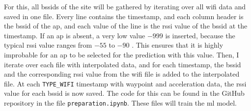 For this, all \acp{bssid} of the site will be gathered by iterating over all \ac{wifi} data and saved in one file.
Every line contains the timestamp, and each column header is the \ac{bssid} of the \ac{ap}, and each value of the line is the \ac{rssi} value of the \ac{bssid} at the timestamp.
If an \ac{ap} is absent, a very low value \(-999\) is inserted, because the typical \ac{rssi} value ranges from \(-55\) to \(-90\) \cite{rssi_calculation}.
This ensures that it is highly improbable for an \ac{ap} to be selected for the prediction with this value.
Then, I iterate over each file with interpolated data, and for each timestamp, the \ac{bssid} and the corresponding \ac{rssi} value from the \ac{wifi} file is added to the interpolated file.
At each \texttt{TYPE\_WIFI} timestamp with waypoint and acceleration data, the \ac{rssi} value for each \ac{bssid} is now saved.
The code for this can be found in the GitHub repository in the file \texttt{preparation.ipynb}.
These files will train the \ac{ml} model.


